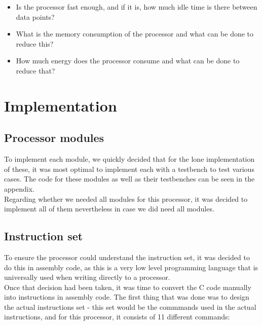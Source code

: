\documentclass[12pt,a4paper]{article}
\begin{document}
	\begin{itemize}
		\item Is the processor fast enough, and if it is, how much idle time is there between data points?
		\item What is the memory consumption of the processor and what can be done to reduce this?
		\item How much energy does the processor consume and what can be done to reduce that?
	\end{itemize}
	
\section{Implementation}
\subsection{Processor modules}
	To implement each module, we quickly decided that for the lone implementation of these, it was most optimal to implement each with a testbench to test various cases. The code for these modules as well as their testbenches can be seen in the appendix.\\
	Regarding whether we needed all modules for this processor, it was decided to implement all of them nevertheless in case we did need all modules.\\
	
\subsection{Instruction set}
	To ensure the processor could understand the instruction set, it was decided to do this in assembly code, as this is a very low level programming language that is universally used when writing directly to a processor.\\
	Once that decision had been taken, it was time to convert the C code manually into instructions in assembly code. The first thing that was done was to design the actual instructions set - this set would be the commmands used in the actual instructions, and for this processor, it consists of 11 different commands:\\
	
\end{document}
